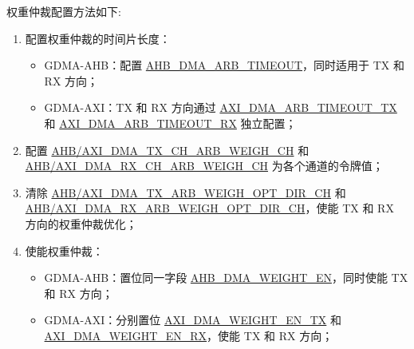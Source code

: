 \documentclass[main\_\_CN.tex]{subfiles}
\begin{document}
权重仲裁配置方法如下:
\begin{enumerate}
\item 配置权重仲裁的时间片长度：
    \begin{itemize}
        \item GDMA-AHB：配置 \hyperref[fielddesc:AHBDMAARBTIMEOUT]{AHB\_DMA\_ARB\_TIMEOUT}，同时适用于 TX 和 RX 方向；
        \item GDMA-AXI：TX 和 RX 方向通过 \hyperref[fielddesc:AXIDMAARBTIMEOUTTX]{AXI\_DMA\_ARB\_TIMEOUT\_TX} 和 \hyperref[fielddesc:AXIDMAARBTIMEOUTRX]{AXI\_DMA\_ARB\_TIMEOUT\_RX} 独立配置；
    \end{itemize}
\item 配置 \hyperref[fielddesc:AHBDMATXCHARBWEIGHCHN]{AHB/AXI\_DMA\_TX\_CH\_ARB\_WEIGH\_CH} 和 \hyperref[fielddesc:AHBDMARXCHARBWEIGHCHN]{AHB/AXI\_DMA\_RX\_CH\_ARB\_WEIGH\_CH} 为各个通道的令牌值；
\item 清除 \hyperref[fielddesc:AHBDMATXARBWEIGHOPTDIRCHN]{AHB/AXI\_DMA\_TX\_ARB\_WEIGH\_OPT\_DIR\_CH} 和 \hyperref[fielddesc:AHBDMARXARBWEIGHOPTDIRCHN]{AHB/AXI\_DMA\_RX\_ARB\_WEIGH\_OPT\_DIR\_CH}，使能 TX 和 RX 方向的权重仲裁优化；
\item 使能权重仲裁：
    \begin{itemize}
        \item GDMA-AHB：置位同一字段 \hyperref[fielddesc:AHBDMAWEIGHTEN]{AHB\_DMA\_WEIGHT\_EN}，同时使能 TX 和 RX 方向；
        \item GDMA-AXI：分别置位 \hyperref[fielddesc:AXIDMAWEIGHTENTX]{AXI\_DMA\_WEIGHT\_EN\_TX} 和 \hyperref[fielddesc:AXIDMAWEIGHTENRX]{AXI\_DMA\_WEIGHT\_EN\_RX}，使能 TX 和 RX 方向；
    \end{itemize}
\end{enumerate}




\end{document}
